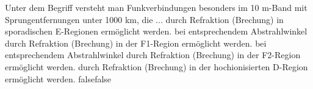     {Unter dem Begriff  versteht man Funkverbindungen besonders im 10 m-Band mit Sprungentfernungen unter 1000 km, die ...}
    {durch Refraktion (Brechung) in sporadischen E-Regionen ermöglicht werden.}
    {bei entsprechendem Abstrahlwinkel durch Refraktion (Brechung) in der F1-Region ermöglicht werden.}
    {bei entsprechendem Abstrahlwinkel durch Refraktion (Brechung) in der F2-Region ermöglicht werden.}
    {durch Refraktion (Brechung) in der hochionisierten D-Region ermöglicht werden.}
    {false}{false}